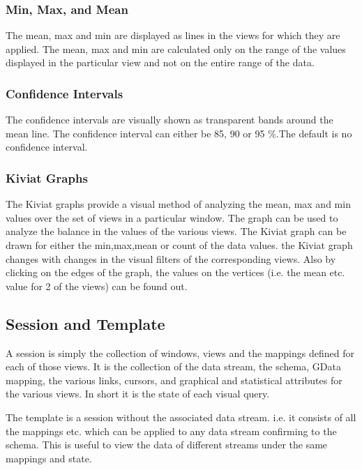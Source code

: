\subsubsection{Min, Max, and Mean}

The mean, max and min are displayed as lines in the views for which
they are applied. The mean, max and min are calculated only on the
range of the values displayed in the particular view and not on the
entire range of the data.

\subsubsection{Confidence Intervals}

The confidence intervals are visually shown as transparent bands
around the mean line. The confidence interval can either be 85, 90 or
95 \%.The default is no confidence interval.

\subsubsection{Kiviat Graphs}

The Kiviat graphs provide a visual method of analyzing the mean, max
and min values over the set of views in a particular window. The graph
can be used to analyze the balance in the values of the various
views. The Kiviat graph can be drawn for either the min,max,mean or
count of the data values. the Kiviat graph changes with changes in the
visual filters of the corresponding views. Also by clicking on the
edges of the graph, the values on the vertices (i.e. the mean
etc. value for 2 of the views) can be found out.

\subsection{Session and Template}

A session is simply the collection of windows, views and the mappings
defined for each of those views. It is the collection of the data
stream, the schema, GData mapping, the various links, cursors, and
graphical and statistical attributes for the various views. In short
it is the state of each visual query.

The template is a session without the associated data stream. i.e. it
consists of all the mappings etc. which can be applied to any data
stream confirming to the schema. This is useful to view the data of
different streams under the same mappings and state.

